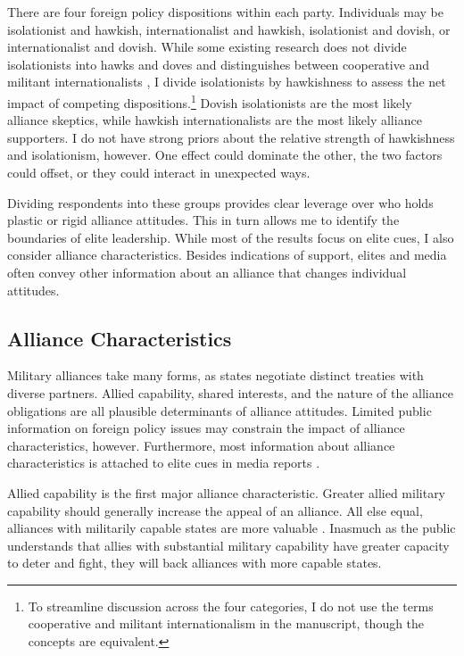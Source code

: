 \documentclass[12pt]{article}
\begin{document}
There are four foreign policy dispositions within each party. 
Individuals may be isolationist and hawkish, internationalist and hawkish, isolationist and dovish, or internationalist and dovish.
While some existing research does not divide isolationists into hawks and doves and distinguishes between cooperative and militant internationalists \citep{Kertzeretal2014}, I divide isolationists by hawkishness to assess the net impact of competing dispositions.\footnote{To streamline discussion across the four categories, I do not use the terms cooperative and militant internationalism in the manuscript, though the concepts are equivalent.}  
Dovish isolationists are the most likely alliance skeptics, while hawkish internationalists are the most likely alliance supporters. 
I do not have strong priors about the relative strength of hawkishness and isolationism, however.
One effect could dominate the other, the two factors could offset, or they could interact in unexpected ways.


Dividing respondents into these groups provides clear leverage over who holds plastic or rigid alliance attitudes. 
This in turn allows me to identify the boundaries of elite leadership. 
While most of the results focus on elite cues, I also consider alliance characteristics. 
Besides indications of support, elites and media often convey other information about an alliance that changes individual attitudes.  



\subsection{Alliance Characteristics}


Military alliances take many forms, as states negotiate distinct treaties with diverse partners.
Allied capability, shared interests, and the nature of the alliance obligations are all plausible determinants of alliance attitudes.   
Limited public information on foreign policy issues may constrain the impact of alliance characteristics, however. 
Furthermore, most information about alliance characteristics is attached to elite cues in media reports \citep{BaumPotter2008}. 


Allied capability is the first major alliance characteristic.
Greater allied military capability should generally increase the appeal of an alliance. 
All else equal, alliances with militarily capable states are more valuable \citep{Johnsonetal2015}. 
Inasmuch as the public understands that allies with substantial military capability have greater capacity to deter and fight, they will back alliances with more capable states. 
\end{document}
